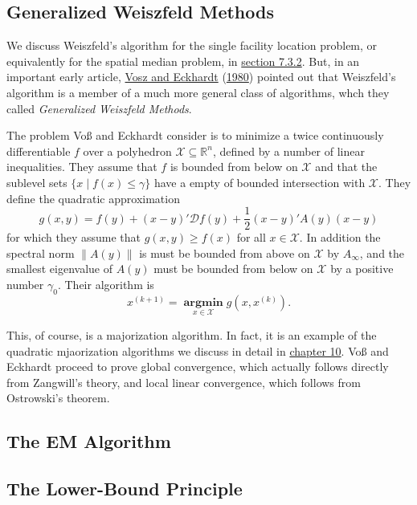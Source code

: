 \documentclass[
  12pt,
]{book}
\begin{document}
\hypertarget{generalized-weiszfeld-methods}{%
\subsection{Generalized Weiszfeld Methods}\label{generalized-weiszfeld-methods}}

We discuss Weiszfeld's algorithm for the single facility location problem, or equivalently for the spatial median problem, in \href{../inequalities/location.md}{section 7.3.2}. But, in an important early article, \protect\hyperlink{ref-vosz_eckhardt_80}{Vosz and Eckhardt} (\protect\hyperlink{ref-vosz_eckhardt_80}{1980}) pointed out that Weiszfeld's
algorithm is a member of a much more general class of algorithms, whch they called \emph{Generalized Weiszfeld Methods}.

The problem Voß and Eckhardt consider is to minimize a twice continuously differentiable \(f\) over a
polyhedron \(\mathcal{X}\subseteq\mathbb{R}^n\), defined by a number of linear inequalities. They assume that \(f\) is bounded from below on \(\mathcal{X}\) and that the sublevel sets \(\{x\mid f(x)\leq\gamma\}\) have a empty of bounded intersection with \(\mathcal{X}\). They
define the quadratic approximation
\[
g(x,y)=f(y)+(x-y)'\mathcal{D}f(y)+\frac12(x-y)'A(y)(x-y)
\]
for which they assume that \(g(x,y)\geq f(x)\) for all \(x\in\mathcal{X}.\) In addition the spectral norm \(\|A(y)\|\) is must be bounded from above on \(\mathcal{X}\) by \(A_\infty\), and the smallest eigenvalue of \(A(y)\) must be bounded from below on \(\mathcal{X}\) by a positive number \(\gamma_0\). Their algorithm is
\[
x^{(k+1)}=\mathop{\mathbf{argmin}}\limits_{x\in\mathcal{X}} g(x,x^{(k)}).
\]

This, of course, is a majorization algorithm. In fact, it is an example of the quadratic mjaorization algorithms we discuss in detail in \href{../quadratic/README.html}{chapter 10}. Voß and Eckhardt proceed to prove global convergence, which actually follows directly from Zangwill's theory, and local linear convergence, which follows from Ostrowski's theorem.

\hypertarget{the-em-algorithm}{%
\subsection{The EM Algorithm}\label{the-em-algorithm}}

\hypertarget{the-lower-bound-principle}{%
\subsection{The Lower-Bound Principle}\label{the-lower-bound-principle}}
\end{document}
